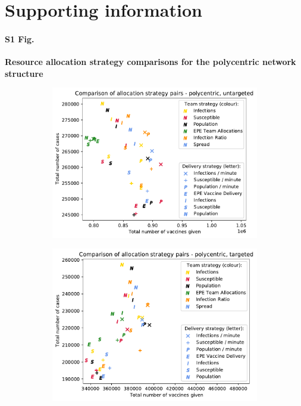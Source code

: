 \documentclass[10pt,letterpaper]{article}
\begin{document}
\section*{Supporting information}
\paragraph*{S1 Fig.}
\label{SI:S1_fig}
{\bf Resource allocation strategy comparisons for the polycentric network structure}
\begin{figure}[ht!]
  \begin{subfigure}[b]{0.5\textwidth}
    \includegraphics[width=\textwidth]{figures/strategies/team_vaccine_scatter_untargeted_polycentric.pdf}
    \label{fig:strat_scatter_unt_poly}
  \end{subfigure}
  \begin{subfigure}[b]{0.5\textwidth}
    \includegraphics[width=\textwidth]{figures/strategies/team_vaccine_scatter_targeted_polycentric.pdf}
    \label{fig:strat_scatter_tar_poly}
  \end{subfigure}
\end{figure}
\end{document}
